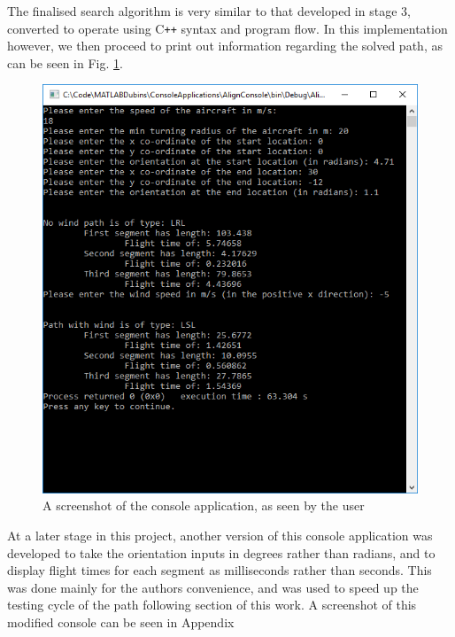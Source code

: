 The finalised search algorithm is very similar to that developed in stage 3, converted to operate using C\texttt{++} syntax and program flow. In this implementation however, we then proceed to print out information regarding the solved path, as can be seen in Fig. \ref{fig:consoledemo}.

\begin{figure}%
\centering    
\includegraphics[width=\textwidth]{Console_Demo}
\caption[Screenshot of the finalised console application]{A screenshot of the console application, as seen by the user}
\label{fig:consoledemo}
\end{figure}

At a later stage in this project, another version of this console application was developed to take the orientation inputs in degrees rather than radians, and to display flight times for each segment as milliseconds rather than seconds. This was done mainly for the authors convenience, and was used to speed up the testing cycle of the path following section of this work. A screenshot of this modified console can be seen in Appendix %

